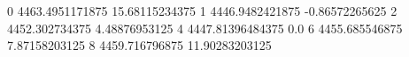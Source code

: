 0 4463.4951171875 15.68115234375
1 4446.9482421875 -0.86572265625
2 4452.302734375 4.48876953125
4 4447.81396484375 0.0
6 4455.685546875 7.87158203125
8 4459.716796875 11.90283203125
